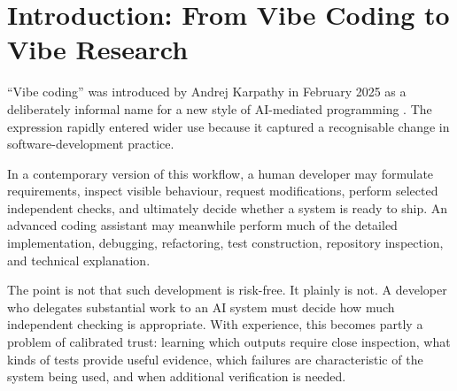 \documentclass[12pt]{article}
\begin{document}
\begin{abstract}
We then consider why comparable practices have been absorbed much more readily into software engineering than into academic publishing. One important difference is institutional. Software-development methodology can change directly through practice: a team which finds a new agentic workflow useful can often begin using it immediately. Academic publishing is governed by formal authorship and ethics policies which change through slower institutional processes. We examine the ACL Policy on Publication Ethics as a particularly relevant example. Its framework for generative assistance, introduced in 2024 and still substantially retained in the current policy, is difficult to map cleanly onto sustained project-scale agentic collaboration.

Our purpose is not to argue that vibe research is risk-free, nor to propose a general rule for AI authorship. We instead identify an asymmetry between software engineering and academic research, examine some of its conceptual, technical, and institutional foundations, and ask whether current academic conventions accurately describe emerging forms of human--AI research collaboration.
\end{abstract}

\section{Introduction: From Vibe Coding to Vibe Research}

``Vibe coding'' was introduced by Andrej Karpathy in February 2025 as a deliberately informal name for a new style of AI-mediated programming \citep{fowler2026vibecoding}. The expression rapidly entered wider use because it captured a recognisable change in software-development practice.

In a contemporary version of this workflow, a human developer may formulate requirements, inspect visible behaviour, request modifications, perform selected independent checks, and ultimately decide whether a system is ready to ship. An advanced coding assistant may meanwhile perform much of the detailed implementation, debugging, refactoring, test construction, repository inspection, and technical explanation.

The point is not that such development is risk-free. It plainly is not. A developer who delegates substantial work to an AI system must decide how much independent checking is appropriate. With experience, this becomes partly a problem of calibrated trust: learning which outputs require close inspection, what kinds of tests provide useful evidence, which failures are characteristic of the system being used, and when additional verification is needed.
\end{document}
